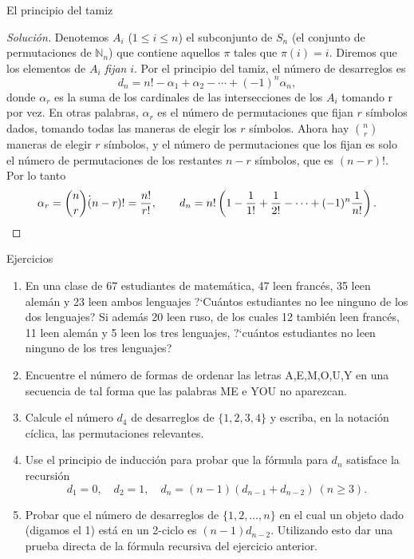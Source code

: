 \documentclass[11pt,spanish,makeidx]{amsbook}
\theoremstyle{definition}
\theoremstyle{remark}
\begin{document}
\begin{section}{El principio del tamiz}
\begin{proof}[Solución]
Denotemos $A_i$ ($1 \le i \le n$) el subconjunto de $S_n$ (el conjunto de permutaciones de $\mathbb N_n$) que contiene aquellos $\pi$ tales que $\pi(i)=i$. Diremos que los elementos de $A_i$
{\it fijan} $i$. Por el principio del tamiz, el número de desarreglos es 
$$
d_n= n! -\alpha_1+\alpha_2 - \cdots +(-1)^n\alpha_n,
$$
donde $\alpha_r$ es la suma de los cardinales de las intersecciones de los $A_i$ tomando r por vez. En otras palabras, $\alpha_r$ es el número de permutaciones que fijan $r$ símbolos
dados, tomando todas las maneras de elegir los $r$ símbolos. Ahora hay $\binom{n}{r} $ maneras de elegir $r$ símbolos, y el número de permutaciones que los fijan es solo el número de permutaciones de
los restantes $n-r$ símbolos, que es $(n-r)!$.  Por lo tanto
$$
\alpha_r = \binom{n}{r} \dot (n-r)! = \frac{n!}{r!},\qquad d_n=
n!\left(1-\frac{1}{1!} + \frac{1}{2!}-\cdots
+(-1)^n\frac{1}{n!}\right). \nopagebreak$$
\end{proof}

\begin{subsection}{Ejercicios}\label{ejerciciosA1.2}
\begin{enumerate}
\item En una clase de 67 estudiantes de matemática, 47 leen francés, 35
leen alemán y 23 leen ambos lenguajes ?`Cuántos estudiantes no lee
ninguno de los dos lenguajes? Si además 20 leen ruso, de los
cuales 12 también leen francés, 11 leen alemán y 5 leen los tres
lenguajes, ?`cuántos estudiantes no leen ninguno de los tres
lenguajes?
\item Encuentre el número de formas de ordenar las letras A,E,M,O,U,Y en
una secuencia de tal forma que las palabras ME e YOU no aparezcan.
\item
Calcule el número $d_4$ de desarreglos de $\{1,2,3,4\}$ y escriba,
en la notación cíclica, las permutaciones relevantes.
\item
Use el principio de inducción para probar que la fórmula para
$d_n$ satisface la recursión
$$
d_1=0, \quad d_2=1,\quad d_n= (n-1)(d_{n-1}+d_{n-2}) \ (n\ge 3).
$$
\item
Probar que el número de desarreglos de $\{1,2,\ldots,n\}$ en el
cual un objeto dado (digamos el 1) está en un 2-ciclo es
$(n-1)d_{n-2}$. Utilizando esto dar una prueba directa de la
fórmula recursiva del ejercicio anterior.
\end{enumerate}
\end{subsection}

\end{section}
\end{document}
